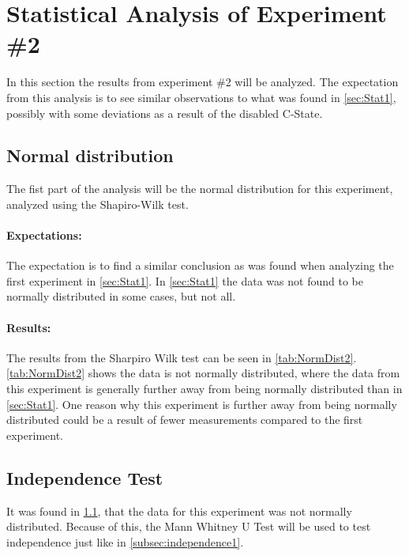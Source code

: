 \section{Statistical Analysis of Experiment \#2}\label{sec:Stat2}
In this section the results from experiment \#2 will be analyzed. The expectation from this analysis is to see similar observations to what was found in \cref{sec:Stat1}, possibly with some deviations as a result of the disabled C-State. 

\subsection{Normal distribution}\label{subsec:NormalDist2}

The fist part of the analysis will be the normal distribution for this experiment, analyzed using the Shapiro-Wilk test.

\paragraph{Expectations:} The expectation is to find a similar conclusion as was found when analyzing the first experiment in \cref{sec:Stat1}. In \cref{sec:Stat1} the data was not found to be normally distributed in some cases, but not all.

 


\paragraph{Results:} The results from the Sharpiro Wilk test can be seen in \cref{tab:NormDist2}. \cref{tab:NormDist2} shows the data is not normally distributed, where the data from this experiment is generally further away from being normally distributed than in \cref{sec:Stat1}. One reason why this experiment is further away from being normally distributed could be a result of fewer measurements compared to the first experiment.

\subsection{Independence Test}\label{subsec:independence2}
It was found in \cref{subsec:NormalDist2}, that the data for this experiment was not normally distributed. Because of this, the Mann Whitney U Test will be used to test independence just like in \cref{subsec:independence1}.

